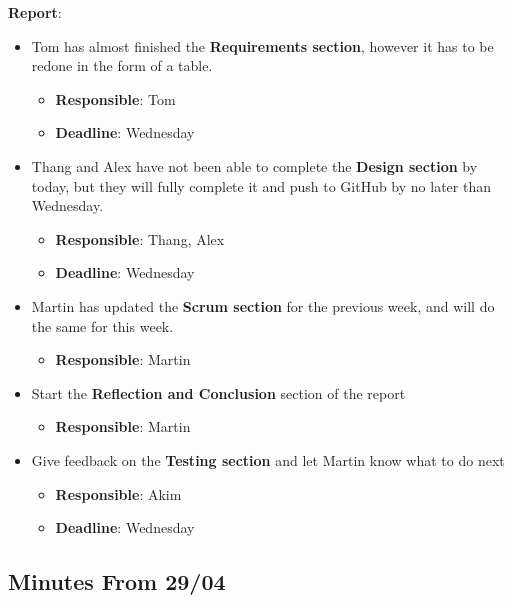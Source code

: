 \documentclass[12pt]{article}
\begin{document}
\newpage
\textbf{Report}:

\begin{itemize}
\tightlist
\item
  Tom has almost finished the \textbf{Requirements section}, however it
  has to be redone in the form of a table.

  \begin{itemize}
  \tightlist
  \item
    \textbf{Responsible}: Tom
  \item
    \textbf{Deadline}: Wednesday
  \end{itemize}
\item
  Thang and Alex have not been able to complete the \textbf{Design
  section} by today, but they will fully complete it and push to GitHub
  by no later than Wednesday.

  \begin{itemize}
  \tightlist
  \item
    \textbf{Responsible}: Thang, Alex
  \item
    \textbf{Deadline}: Wednesday
  \end{itemize}
\item
  Martin has updated the \textbf{Scrum section} for the previous week,
  and will do the same for this week.

  \begin{itemize}
  \tightlist
  \item
    \textbf{Responsible}: Martin
  \end{itemize}
\item
  Start the \textbf{Reflection and Conclusion} section of the report

  \begin{itemize}
  \tightlist
  \item
    \textbf{Responsible}: Martin
  \end{itemize}
\item
  Give feedback on the \textbf{Testing section} and let Martin know what
  to do next

  \begin{itemize}
  \tightlist
  \item
    \textbf{Responsible}: Akim
  \item
    \textbf{Deadline}: Wednesday
  \end{itemize}
\end{itemize}

\hypertarget{minutes-from-2904}{%
\subsection{Minutes From 29/04}\label{minutes-from-2904}}
\end{document}
